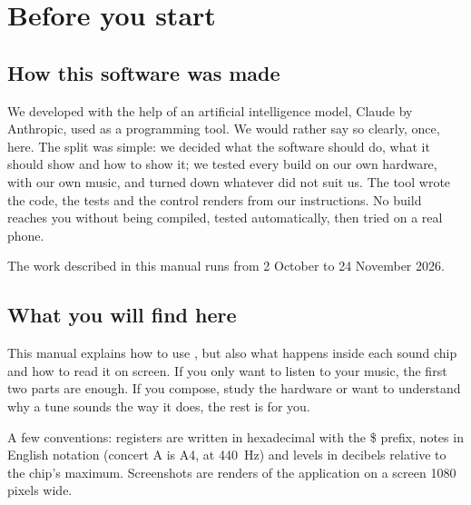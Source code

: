 \chapter*{Before you start}

\section*{How this software was made}
We developed \soft with the help of an artificial intelligence model, Claude by Anthropic, used as a programming
tool. We would rather say so clearly, once, here. The split was simple: we decided what the software should do, what
it should show and how to show it; we tested every build on our own hardware, with our own music, and turned down
whatever did not suit us. The tool wrote the code, the tests and the control renders from our instructions. No
build reaches you without being compiled, tested automatically, then tried on a real phone.

The work described in this manual runs from 2 October to 24 November 2026.

\section*{What you will find here}
This manual explains how to use \soft, but also what happens inside each sound chip and how to read it on screen.
If you only want to listen to your music, the first two parts are enough. If you compose, study the hardware or want
to understand why a tune sounds the way it does, the rest is for you.

A few conventions: registers are written in hexadecimal with the \$ prefix, notes in English notation (concert A is
A4, at 440~Hz) and levels in decibels relative to the chip's maximum. Screenshots are renders of the application on
a screen 1080 pixels wide.
